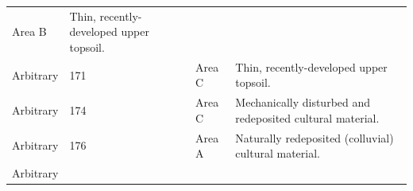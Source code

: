 \documentclass[
  12pt,
]{krantz}
\begin{document}
\begin{longtable}[]{@{}llll@{}}
\begin{minipage}[t]{0.16\columnwidth}
Area B\strut
\end{minipage} & \begin{minipage}[t]{0.38\columnwidth}\raggedright
Thin, recently-developed
upper topsoil.\strut
\end{minipage}\tabularnewline
\begin{minipage}[t]{0.18\columnwidth}\raggedright
Arbitrary\strut
\end{minipage} & \begin{minipage}[t]{0.11\columnwidth}\raggedright
171\strut
\end{minipage} & \begin{minipage}[t]{0.16\columnwidth}\raggedright
Area C\strut
\end{minipage} & \begin{minipage}[t]{0.38\columnwidth}\raggedright
Thin, recently-developed
upper topsoil.\strut
\end{minipage}\tabularnewline
\begin{minipage}[t]{0.18\columnwidth}\raggedright
Arbitrary\strut
\end{minipage} & \begin{minipage}[t]{0.11\columnwidth}\raggedright
174\strut
\end{minipage} & \begin{minipage}[t]{0.16\columnwidth}\raggedright
Area C\strut
\end{minipage} & \begin{minipage}[t]{0.38\columnwidth}\raggedright
Mechanically disturbed and
redeposited cultural
material.\strut
\end{minipage}\tabularnewline
\begin{minipage}[t]{0.18\columnwidth}\raggedright
Arbitrary\strut
\end{minipage} & \begin{minipage}[t]{0.11\columnwidth}\raggedright
176\strut
\end{minipage} & \begin{minipage}[t]{0.16\columnwidth}\raggedright
Area A\strut
\end{minipage} & \begin{minipage}[t]{0.38\columnwidth}\raggedright
Naturally redeposited
(colluvial) cultural
material.\strut
\end{minipage}\tabularnewline
\begin{minipage}[t]{0.18\columnwidth}\raggedright
Arbitrary\strut
\end{minipage} & \begin{minipage}[t]{0.11\columnwidth}\raggedright

\end{minipage}
\end{longtable}
\end{document}
